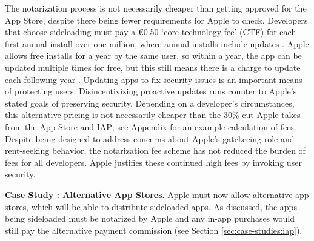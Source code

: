 \documentclass[letterpaper,twocolumn,10pt]{article}
\newcommand{\subh}[1]{\smallskip \noindent \textbf{{#1}}.}
\renewcommand{\paragraph}[1]{\subh{#1}}
\begin{document}
The notarization process is not necessarily cheaper than getting approved for the App Store, despite there being fewer requirements for Apple to check.  Developers that choose sideloading must pay a €0.50 `core technology fee' (CTF) for each first annual install over one million, where annual installs include updates \cite{apple_web_sideloading}. Apple allows free installs for a year by the same user, so within a year, the app can be updated multiple times for free, but this still means there is a charge to update each following year \cite{apple_ctf}. Updating apps to fix security issues is an important means of protecting users.  Disincentivizing proactive updates runs counter to Apple's stated goals of preserving security.  Depending on a developer's circumstances, this alternative pricing is not necessarily cheaper than the 30\% cut Apple takes from the App Store and IAP; see Appendix for an example calculation of fees.  Despite being designed to address concerns about Apple's gatekeeing role and rent-seeking behavior, the notarization fee scheme has not reduced the burden of fees for all developers. Apple justifies these continued high fees by invoking user security.



\paragraph{Case Study \thecasestudy: Alternative App Stores}
\label{cs:app-stores}
Apple must now allow alternative app stores, which will be able to distribute sideloaded apps. As discussed, the apps being sideloaded must be notarized by Apple and any in-app purchases would still pay the alternative payment commission (see Section \ref{sec:case-studies:iap}).  
\end{document}
